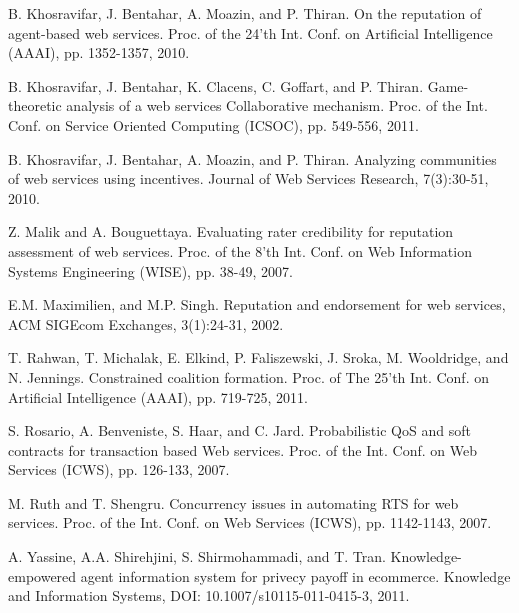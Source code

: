\documentclass[runningheads,a4paper]{llncs}
\begin{document}
\begin{thebibliography}{1}
B. Khosravifar, J. Bentahar, A. Moazin, and P. Thiran. On the
reputation of agent-based web services. Proc. of the 24'th Int.
Conf. on Artificial Intelligence (AAAI), pp. 1352-1357, 2010.


B. Khosravifar, J. Bentahar, K. Clacens, C. Goffart, and P.
Thiran. Game-theoretic analysis of a web services Collaborative
mechanism. Proc. of the Int. Conf. on Service Oriented Computing
(ICSOC), pp. 549-556, 2011.


B. Khosravifar, J. Bentahar, A. Moazin, and P. Thiran. Analyzing
communities of web services using incentives. Journal of Web
Services Research, 7(3):30-51, 2010.


Z. Malik and A. Bouguettaya. Evaluating rater credibility for
reputation assessment of web services. Proc. of the 8'th Int.
Conf. on Web Information Systems Engineering (WISE), pp. 38-49,
2007.


E.M. Maximilien, and M.P. Singh. Reputation and endorsement for
web services, ACM SIGEcom Exchanges, 3(1):24-31, 2002.

T. Rahwan, T. Michalak, E. Elkind, P. Faliszewski, J. Sroka, M.
Wooldridge, and N. Jennings. Constrained coalition formation.
Proc. of The 25'th Int. Conf. on Artificial Intelligence (AAAI),
pp. 719-725, 2011.

S. Rosario, A. Benveniste, S. Haar, and C. Jard. Probabilistic QoS
and soft contracts for transaction based Web services. Proc. of
the Int. Conf. on Web Services (ICWS), pp. 126-133, 2007.

M. Ruth and  T. Shengru. Concurrency issues in automating RTS for
web services. Proc. of the Int. Conf. on Web Services (ICWS), pp.
1142-1143, 2007.


A. Yassine, A.A. Shirehjini, S. Shirmohammadi, and T. Tran.
Knowledge-empowered agent information system for privecy payoff in
ecommerce. Knowledge and Information Systems, DOI:
10.1007/s10115-011-0415-3, 2011.

\end{thebibliography}
\end{document}
